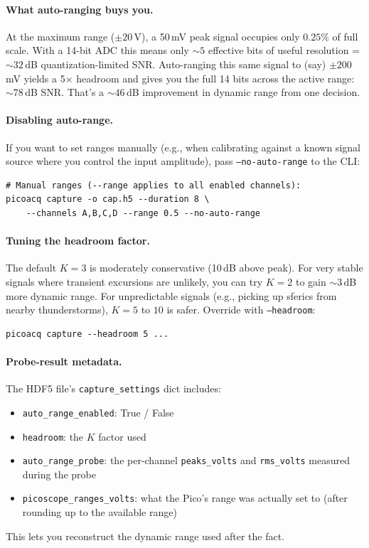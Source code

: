 \documentclass[11pt]{article}
\begin{document}
\paragraph{What auto-ranging buys you.}  At the maximum range
($\pm 20$\,V), a 50\,mV peak signal occupies only $0.25\%$ of full
scale.  With a 14-bit ADC this means only $\sim 5$ effective bits of
useful resolution = $\sim 32$\,dB quantization-limited SNR.
Auto-ranging this same signal to (say) $\pm 200$\,mV yields a 5×
headroom and gives you the full 14 bits across the active range:
$\sim 78$\,dB SNR.  That's a $\sim 46$\,dB improvement in dynamic
range from one decision.

\paragraph{Disabling auto-range.}  If you want to set ranges manually
(e.g., when calibrating against a known signal source where you
control the input amplitude), pass \texttt{--no-auto-range} to the
CLI:

\begin{lstlisting}[style=shell]
# Manual ranges (--range applies to all enabled channels):
picoacq capture -o cap.h5 --duration 8 \
    --channels A,B,C,D --range 0.5 --no-auto-range
\end{lstlisting}

\paragraph{Tuning the headroom factor.}  The default $K = 3$ is
moderately conservative (10\,dB above peak).  For very stable signals
where transient excursions are unlikely, you can try $K = 2$ to gain
$\sim 3$\,dB more dynamic range.  For unpredictable signals (e.g.,
picking up sferics from nearby thunderstorms),
$K = 5$ to $10$ is safer.  Override with \texttt{--headroom}:

\begin{lstlisting}[style=shell]
picoacq capture --headroom 5 ...
\end{lstlisting}

\paragraph{Probe-result metadata.}  The HDF5 file's
\texttt{capture\_settings} dict includes:
\begin{itemize}\itemsep=2pt
\item \texttt{auto\_range\_enabled}: True / False
\item \texttt{headroom}: the $K$ factor used
\item \texttt{auto\_range\_probe}: the per-channel \texttt{peaks\_volts}
      and \texttt{rms\_volts} measured during the probe
\item \texttt{picoscope\_ranges\_volts}: what the Pico's range was
      actually set to (after rounding up to the available range)
\end{itemize}
This lets you reconstruct the dynamic range used after the fact.
\end{document}
